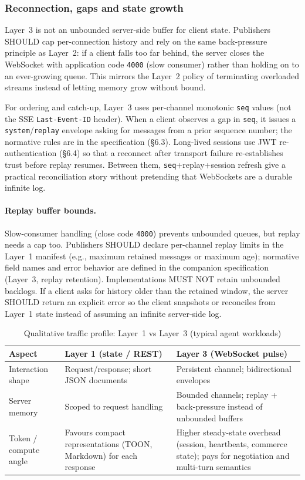 \documentclass[12pt,a4paper]{article}
\begin{document}
\subsubsection{Reconnection, gaps and state growth}
Layer~3 is not an unbounded server-side buffer for client state. Publishers SHOULD cap per-connection history and rely on the same back-pressure principle as Layer~2: if a client falls too far behind, the server closes the WebSocket with application code \texttt{4000} (slow consumer) rather than holding on to an ever-growing queue. This mirrors the Layer~2 policy of terminating overloaded streams instead of letting memory grow without bound.

For ordering and catch-up, Layer~3 uses per-channel monotonic \texttt{seq} values (not the SSE \texttt{Last-Event-ID} header). When a client observes a gap in \texttt{seq}, it issues a \texttt{system}/\texttt{replay} envelope asking for messages from a prior sequence number; the normative rules are in the specification (\S6.3). Long-lived sessions use JWT re-authentication (\S6.4) so that a reconnect after transport failure re-establishes trust before replay resumes. Between them, \texttt{seq}+replay+session refresh give a practical reconciliation story without pretending that WebSockets are a durable infinite log.

\paragraph{Replay buffer bounds.}
Slow-consumer handling (close code \texttt{4000}) prevents unbounded queues, but replay needs a cap too. Publishers SHOULD declare per-channel replay limits in the Layer~1 manifest (e.g., maximum retained messages or maximum age); normative field names and error behavior are defined in the companion specification (Layer~3, replay retention). Implementations MUST NOT retain unbounded backlogs. If a client asks for history older than the retained window, the server SHOULD return an explicit error so the client snapshots or reconciles from Layer~1 state instead of assuming an infinite server-side log.

\begin{table}[h!]
\centering
\caption{Qualitative traffic profile: Layer~1 vs Layer~3 (typical agent workloads)}
\label{tab:layer-cost}
\renewcommand{\arraystretch}{1.25}
\begin{tabular}{|p{3.0cm}|p{5.5cm}|p{5.5cm}|}
\hline
\textbf{Aspect} & \textbf{Layer 1 (state / REST)} & \textbf{Layer 3 (WebSocket pulse)} \\
\hline
Interaction shape & Request/response; short JSON documents & Persistent channel; bidirectional envelopes \\
\hline
Server memory & Scoped to request handling & Bounded channels; replay + back-pressure instead of unbounded buffers \\
\hline
Token / compute angle & Favours compact representations (TOON, Markdown) for each response & Higher steady-state overhead (session, heartbeats, commerce state); pays for negotiation and multi-turn semantics \\
\hline
\end{tabular}
\end{table}
\end{document}
